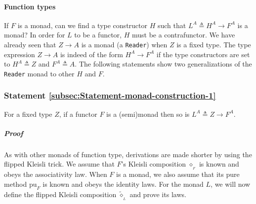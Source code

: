 \paragraph{Function types}

If $F$ is a monad, can we find a type constructor $H$ such that
$L^{A}\triangleq H^{A}\rightarrow F^{A}$ is a monad? In order for
$L$ to be a functor, $H$ must be a contrafunctor. We have already
seen that $Z\rightarrow A$ is a monad (a \lstinline!Reader!) when
$Z$ is a fixed type. The type expression $Z\rightarrow A$ is indeed
of the form $H^{A}\rightarrow F^{A}$ if the type constructors are
set to $H^{A}\triangleq Z$ and $F^{A}\triangleq A$. The following
statements show two generalizations of the \lstinline!Reader! monad
to other $H$ and $F$.

\subsubsection{Statement \label{subsec:Statement-monad-construction-1}\ref{subsec:Statement-monad-construction-1}}

For a fixed type $Z$, if a functor $F$ is a (semi)monad then so
is $L^{A}\triangleq Z\rightarrow F^{A}$.

\subparagraph{Proof}

As with other monads of function type, derivations are made shorter
by using the flipped Kleisli trick. We assume that $F$\textsf{'}s Kleisli
composition $\diamond_{_{F}}$ is known and obeys the associativity
law. When $F$ is a monad, we also assume that its pure method $\text{pu}_{F}$
is known and obeys the identity laws. For the monad $L$, we will
now define the flipped
Kleisli composition $\tilde{\diamond}_{_{L}}$ and prove its laws.

